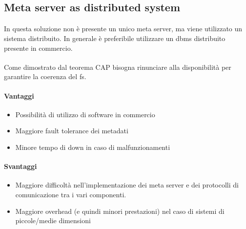 \documentclass{article}
\begin{document}
\subsection{Meta server as distributed system}

\paragraph{} In questa soluzione non è presente un unico meta server, ma viene utilizzato un sistema distribuito. In generale è preferibile utilizzare un dbms distribuito presente in commercio.

\paragraph{} Come dimostrato dal teorema CAP bisogna rinunciare alla disponibilità per garantire la coerenza del fs. 

\paragraph{Vantaggi} \begin{itemize}
	\item Possibilità di utilizzo di software in commercio
	\item Maggiore fault tolerance dei metadati
	\item Minore tempo di down in caso di malfunzionamenti
\end{itemize}

\paragraph{Svantaggi} \begin{itemize}
	\item Maggiore difficoltà nell'implementazione dei meta server e dei protocolli di comunicazione tra i vari componenti. 
	\item Maggiore overhead (e quindi minori prestazioni) nel caso di sistemi di piccole/medie dimensioni
\end{itemize}
\end{document}
